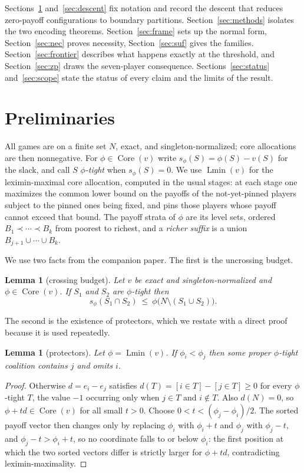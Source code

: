 \documentclass[11pt]{article}
\newtheorem{lemma}[theorem]{Lemma}
\newcommand{\core}{\operatorname{Core}}
\newcommand{\Lmin}{\operatorname{Lmin}}
\begin{document}
\medskip
Sections~\ref{sec:prelim} and~\ref{sec:descent} fix notation and record the
descent that reduces zero-payoff configurations to boundary partitions.
Section~\ref{sec:methods} isolates the two encoding theorems.
Section~\ref{sec:frame} sets up the normal form, Section~\ref{sec:nec} proves
necessity, Section~\ref{sec:suf} gives the families.  Section~\ref{sec:frontier}
describes what happens exactly at the threshold, and Section~\ref{sec:zp} draws
the seven-player consequence.  Sections~\ref{sec:status}
and~\ref{sec:scope} state the status of every claim and the limits of the
result.

\section{Preliminaries}\label{sec:prelim}

All games are on a finite set $N$, exact, and singleton-normalized; core
allocations are then nonnegative.  For $\phi\in\core(v)$ write
$s_\phi(S)=\phi(S)-v(S)$ for the slack, and call $S$ \emph{$\phi$-tight} when
$s_\phi(S)=0$.  We use $\Lmin(v)$ for the leximin-maximal core allocation,
computed in the usual stages: at each stage one maximizes the common lower
bound on the payoffs of the not-yet-pinned players subject to the pinned ones
being fixed, and pins those players whose payoff cannot exceed that bound.  The
payoff strata of $\phi$ are its level sets, ordered $B_1\prec\cdots\prec B_k$
from poorest to richest, and a \emph{richer suffix} is a union
$B_{j+1}\cup\cdots\cup B_k$.

We use two facts from the companion paper.  The first is the uncrossing budget.

\begin{lemma}[crossing budget]\label{lem:cross}
Let $v$ be exact and singleton-normalized and $\phi\in\core(v)$.  If $S_1$ and
$S_2$ are $\phi$-tight then
\[
 s_\phi(S_1\cap S_2)\ \le\ \phi\bigl(N\setminus(S_1\cup S_2)\bigr).
\]
\end{lemma}

The second is the existence of protectors, which we restate with a direct proof
because it is used repeatedly.

\begin{lemma}[protectors]\label{lem:prot}
Let $\phi=\Lmin(v)$.  If $\phi_i<\phi_j$ then some proper $\phi$-tight
coalition contains $j$ and omits $i$.
\end{lemma}

\begin{proof}
Otherwise $d=e_i-e_j$ satisfies $d(T)=[i\in T]-[j\in T]\ge0$ for every
$\phi$-tight $T$, the value $-1$ occurring only when $j\in T$ and $i\notin T$.
Also $d(N)=0$, so $\phi+td\in\core(v)$ for all small $t>0$.  Choose
$0<t<(\phi_j-\phi_i)/2$.  The sorted payoff vector then changes only by
replacing $\phi_i$ with $\phi_i+t$ and $\phi_j$ with $\phi_j-t$, and
$\phi_j-t>\phi_i+t$, so no coordinate falls to or below $\phi_i$: the first
position at which the two sorted vectors differ is strictly larger for
$\phi+td$, contradicting leximin-maximality.
\end{proof}
\end{document}
